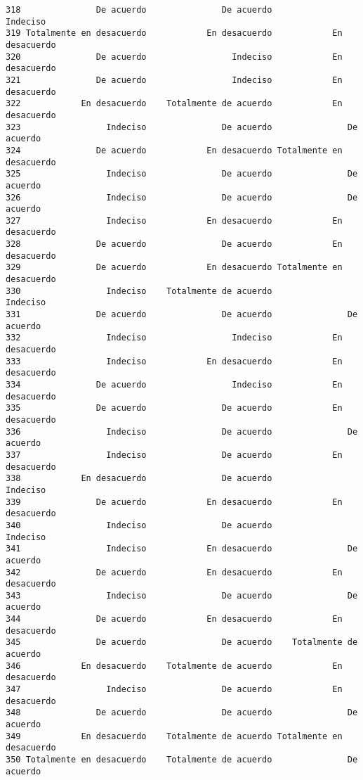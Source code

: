 \documentclass[
  letterpaper,
  DIV=11,
  numbers=noendperiod]{scrartcl}
\begin{document}
\begin{verbatim}
318               De acuerdo               De acuerdo                 Indeciso
319 Totalmente en desacuerdo            En desacuerdo            En desacuerdo
320               De acuerdo                 Indeciso            En desacuerdo
321               De acuerdo                 Indeciso            En desacuerdo
322            En desacuerdo    Totalmente de acuerdo            En desacuerdo
323                 Indeciso               De acuerdo               De acuerdo
324               De acuerdo            En desacuerdo Totalmente en desacuerdo
325                 Indeciso               De acuerdo               De acuerdo
326                 Indeciso               De acuerdo               De acuerdo
327                 Indeciso            En desacuerdo            En desacuerdo
328               De acuerdo               De acuerdo            En desacuerdo
329               De acuerdo            En desacuerdo Totalmente en desacuerdo
330                 Indeciso    Totalmente de acuerdo                 Indeciso
331               De acuerdo               De acuerdo               De acuerdo
332                 Indeciso                 Indeciso            En desacuerdo
333                 Indeciso            En desacuerdo            En desacuerdo
334               De acuerdo                 Indeciso            En desacuerdo
335               De acuerdo               De acuerdo            En desacuerdo
336                 Indeciso               De acuerdo               De acuerdo
337                 Indeciso               De acuerdo            En desacuerdo
338            En desacuerdo               De acuerdo                 Indeciso
339               De acuerdo            En desacuerdo            En desacuerdo
340                 Indeciso               De acuerdo                 Indeciso
341                 Indeciso            En desacuerdo               De acuerdo
342               De acuerdo            En desacuerdo            En desacuerdo
343                 Indeciso               De acuerdo               De acuerdo
344               De acuerdo            En desacuerdo            En desacuerdo
345               De acuerdo               De acuerdo    Totalmente de acuerdo
346            En desacuerdo    Totalmente de acuerdo            En desacuerdo
347                 Indeciso               De acuerdo            En desacuerdo
348               De acuerdo               De acuerdo               De acuerdo
349            En desacuerdo    Totalmente de acuerdo Totalmente en desacuerdo
350 Totalmente en desacuerdo    Totalmente de acuerdo               De acuerdo

\end{verbatim}
\end{document}
